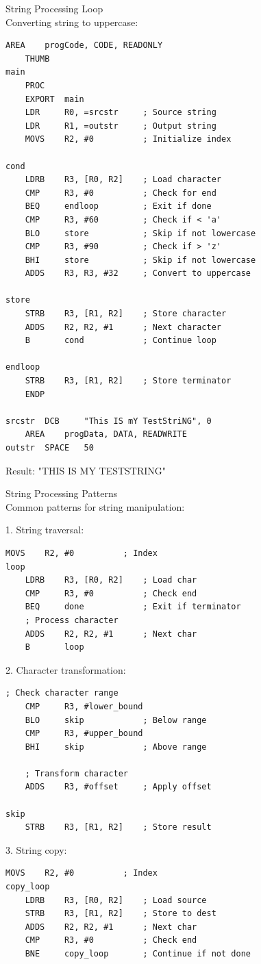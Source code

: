 \begin{example2}{String Processing Loop}\\
Converting string to uppercase:
\begin{lstlisting}[language=armasm, style=basesmol]
    AREA    progCode, CODE, READONLY
    THUMB
main
    PROC
    EXPORT  main
    LDR     R0, =srcstr     ; Source string
    LDR     R1, =outstr     ; Output string
    MOVS    R2, #0          ; Initialize index
    
cond
    LDRB    R3, [R0, R2]    ; Load character
    CMP     R3, #0          ; Check for end
    BEQ     endloop         ; Exit if done
    CMP     R3, #60         ; Check if < 'a'
    BLO     store           ; Skip if not lowercase
    CMP     R3, #90         ; Check if > 'z'
    BHI     store           ; Skip if not lowercase
    ADDS    R3, R3, #32     ; Convert to uppercase
    
store
    STRB    R3, [R1, R2]    ; Store character
    ADDS    R2, R2, #1      ; Next character
    B       cond            ; Continue loop
    
endloop
    STRB    R3, [R1, R2]    ; Store terminator
    ENDP
    
srcstr  DCB     "This IS mY TestStriNG", 0
    AREA    progData, DATA, READWRITE
outstr  SPACE   50
\end{lstlisting}

Result: "THIS IS MY TESTSTRING"
\end{example2}

\begin{KR}{String Processing Patterns}\\
Common patterns for string manipulation:

1. String traversal:
\begin{lstlisting}[language=armasm, style=basesmol]
    MOVS    R2, #0          ; Index
loop
    LDRB    R3, [R0, R2]    ; Load char
    CMP     R3, #0          ; Check end
    BEQ     done            ; Exit if terminator
    ; Process character
    ADDS    R2, R2, #1      ; Next char
    B       loop
\end{lstlisting}

2. Character transformation:
\begin{lstlisting}[language=armasm, style=basesmol]
    ; Check character range
    CMP     R3, #lower_bound
    BLO     skip            ; Below range
    CMP     R3, #upper_bound
    BHI     skip            ; Above range
    
    ; Transform character
    ADDS    R3, #offset     ; Apply offset
    
skip
    STRB    R3, [R1, R2]    ; Store result
\end{lstlisting}

3. String copy:
\begin{lstlisting}[language=armasm, style=basesmol]
    MOVS    R2, #0          ; Index
copy_loop
    LDRB    R3, [R0, R2]    ; Load source
    STRB    R3, [R1, R2]    ; Store to dest
    ADDS    R2, R2, #1      ; Next char
    CMP     R3, #0          ; Check end
    BNE     copy_loop       ; Continue if not done
\end{lstlisting}
\end{KR}

